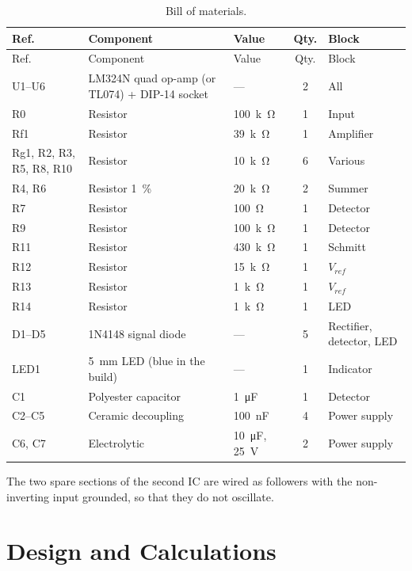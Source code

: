 \documentclass[11pt,letterpaper]{article}
\newcommand{\Vref}{V_{ref}}
\begin{document}
{\small
\begin{longtable}{@{}>{\raggedright}p{3.0cm}>{\raggedright}p{5.6cm}>{\raggedright}p{2.4cm}c>{\raggedright\arraybackslash}p{2.7cm}@{}}
\caption{Bill of materials.}\label{tab:bom}\\
\toprule
Ref. & Component & Value & Qty. & Block \\
\midrule
\endfirsthead
\toprule
Ref. & Component & Value & Qty. & Block \\
\midrule
\endhead
U1--U6 & LM324N quad op-amp (or TL074) + DIP-14 socket & --- & 2 & All \\
R0 & Resistor & \SI{100}{k\ohm} & 1 & Input \\
Rf1 & Resistor & \SI{39}{k\ohm} & 1 & Amplifier \\
Rg1, R2, R3, R5, R8, R10 & Resistor & \SI{10}{k\ohm} & 6 & Various \\
R4, R6 & Resistor \SI{1}{\percent} & \SI{20}{k\ohm} & 2 & Summer \\
R7 & Resistor & \SI{100}{\ohm} & 1 & Detector \\
R9 & Resistor & \SI{100}{k\ohm} & 1 & Detector \\
R11 & Resistor & \SI{430}{k\ohm} & 1 & Schmitt \\
R12 & Resistor & \SI{15}{k\ohm} & 1 & $\Vref$ \\
R13 & Resistor & \SI{1}{k\ohm} & 1 & $\Vref$ \\
R14 & Resistor & \SI{1}{k\ohm} & 1 & LED \\
D1--D5 & 1N4148 signal diode & --- & 5 & Rectifier, detector, LED \\
LED1 & \SI{5}{mm} LED (blue in the build) & --- & 1 & Indicator \\
C1 & Polyester capacitor & \SI{1}{\micro F} & 1 & Detector \\
C2--C5 & Ceramic decoupling & \SI{100}{nF} & 4 & Power supply \\
C6, C7 & Electrolytic & \SI{10}{\micro F}, \SI{25}{V} & 2 & Power supply \\
\bottomrule
\end{longtable}
}

The two spare sections of the second IC are wired as followers with the non-inverting input grounded, so that they do not oscillate.

\section{Design and Calculations}
\end{document}

